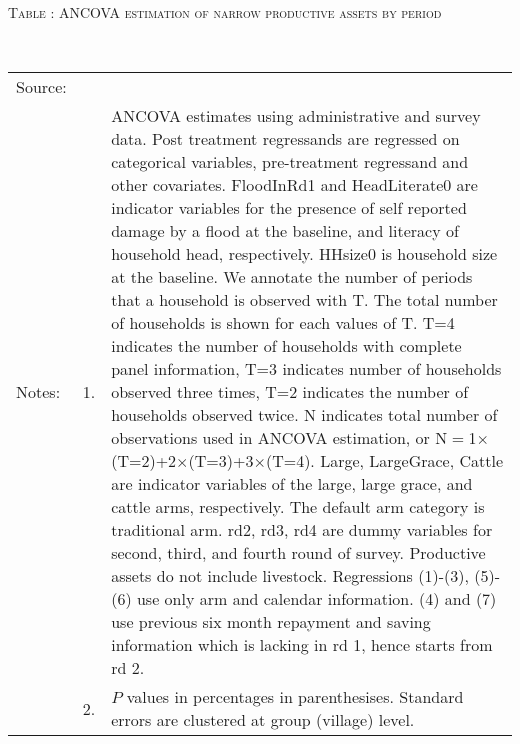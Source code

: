 \hspace{-1cm}\begin{minipage}[t]{14cm}
\hfil\textsc{\normalsize Table \thetable: ANCOVA estimation of narrow productive assets by period\label{tab ANCOVA narrow productive assets timevarying}}\\
\setlength{\tabcolsep}{1pt}
\setlength{\baselineskip}{8pt}
\renewcommand{\arraystretch}{.55}
\hfil{}\\
\renewcommand{\arraystretch}{.8}
\setlength{\tabcolsep}{1pt}
\begin{tabular}{>{\hfill\scriptsize}p{1cm}<{}>{\hfill\scriptsize}p{.25cm}<{}>{\scriptsize}p{12cm}<{\hfill}}
Source:& \multicolumn{2}{l}{\scriptsize Estimated with GUK administrative and survey data.}\\
Notes: & 1. & ANCOVA estimates using administrative and survey data. Post treatment regressands are regressed on categorical variables, pre-treatment regressand and other covariates. \textsf{FloodInRd1} and \textsf{HeadLiterate0} are indicator variables for the presence of self reported damage by a flood at the baseline, and literacy of household head, respectively. \textsf{HHsize0} is household size at the baseline. We annotate the number of periods that a household is observed with \textsf{T}. The total number of households is shown for each values of \textsf{T}. \textsf{T=4} indicates the number of households with complete panel information, \textsf{T=3} indicates number of households observed three times, \textsf{T=2} indicates the number of households observed twice. \textsf{N} indicates total number of observations used in ANCOVA estimation, or \textsf{N$=$1$\times$(T=2)+2$\times$(T=3)+3$\times$(T=4)}.  \textsf{Large}, \textsf{LargeGrace}, \textsf{Cattle} are indicator variables of the \textsf{large}, \textsf{large grace}, and \textsf{cattle} arms, respectively. The default arm category is \textsf{traditional} arm. \textsf{rd2, rd3, rd4} are dummy variables for second, third, and fourth round of survey.  Productive assets do not include livestock. Regressions (1)-(3), (5)-(6) use only arm and calendar information. (4) and (7) use previous six month repayment and saving information which is lacking in rd 1, hence starts from rd 2.\\
& 2. & $P$ values in percentages in parenthesises. Standard errors are clustered at group (village) level.
\end{tabular}
\end{minipage}

